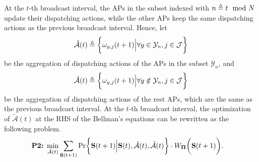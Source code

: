 At the $t$-th broadcast interval, the APs in the subset indexed with $n \triangleq t \mod{N}$ update their dispatching actions, while the other APs keep the same dispatching actions as the previous broadcast interval.
Hence, let
\begin{align}
    \tilde{\mathcal{A}}(t) \triangleq \bigg\{ {\omega}_{y,j}(t+1) \Big| \forall y\in\mathcal{Y}_{n},j\in\mathcal{J} \bigg\}
\end{align}
be the aggregation of dispatching actions of the APs in the subset $\mathcal{Y}_{n}$, and
\begin{align}
    \hat{\mathcal{A}}(t) \triangleq \bigg\{ {\omega}_{y,j}(t+1) \Big| \forall y\notin\mathcal{Y}_{n}, j\in\mathcal{J}\bigg\}
\end{align}
be the aggregation of dispatching actions of the rest APs, which are the same as the previous broadcast interval.
At the $t$-th broadcast interval, the optimization of $\tilde{\mathcal{A}}(t)$ at the RHS of the Bellman's equations can be rewritten as the following problem.
\begin{align}
    \textbf{P2:}~
    \min_{ \tilde{\mathcal{A}}(t) }
    &\sum_{\Stat(t+1)} \Pr\Brace{
        \Stat(t+1) \Big| \Stat(t), \hat{\mathcal{A}}(t), \tilde{\mathcal{A}}(t)
    } \cdot W_{\Baseline}\Paren{\Stat(t+1)}.
\end{align}

